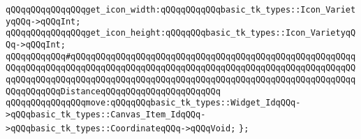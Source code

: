 \verb|qQQqqQQqqQQqqQQqget_icon_width:qQQqqQQqqQQqbasic_tk_types::Icon_VarietyqQQq->qQQqInt;|\newline
\verb|qQQqqQQqqQQqqQQqget_icon_height:qQQqqQQqbasic_tk_types::Icon_VarietyqQQq->qQQqInt;|\newline
\newline
\verb|qQQqqQQqqQQq#qQQqqQQqqQQqqQQqqQQqqQQqqQQqqQQqqQQqqQQqqQQqqQQqqQQqqQQqqQQqqQQqqQQqqQQqqQQqqQQqqQQqqQQqqQQqqQQqqQQqqQQqqQQqqQQqqQQqqQQqqQQqqQQqqQQqqQQqqQQqqQQqqQQqqQQqqQQqqQQqqQQqqQQqqQQqqQQqqQQqqQQqqQQqqQQqqQQqqQQqqQQqqQQqDistanceqQQqqQQqqQQqqQQqqQQqqQQq|\newline
\verb|qQQqqQQqqQQqqQQqmove:qQQqqQQqbasic_tk_types::Widget_IdqQQq->qQQqbasic_tk_types::Canvas_Item_IdqQQq->qQQqbasic_tk_types::CoordinateqQQq->qQQqVoid;|\newline
\newline
\verb|};|\newline

